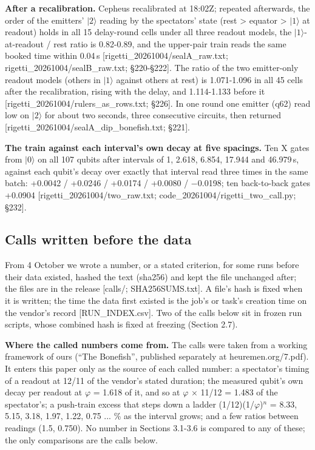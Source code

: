 \documentclass[11pt]{article}
\begin{document}
\textbf{After a recalibration.} Cepheus recalibrated at 18:02Z; repeated afterwards, the order of the emitters' \(|2\rangle\) reading by the spectators' state (rest \textgreater{} equator \textgreater{} \(|1\rangle\) at readout) holds in all 15 delay-round cells under all three readout models, the \(|1\rangle\)-at-readout / rest ratio is 0.82-0.89, and the upper-pair train reads the same booked time within 0.04\,\textmu s {[}rigetti\_20261004/sealA\_raw.txt; rigetti\_20261004/sealB\_raw.txt; \S{}220-\S{}222{]}. The ratio of the two emitter-only readout models (others in \(|1\rangle\) against others at rest) is 1.071-1.096 in all 45 cells after the recalibration, rising with the delay, and 1.114-1.133 before it {[}rigetti\_20261004/rulers\_as\_rows.txt; \S{}226{]}. In one round one emitter (q62) read low on \(|2\rangle\) for about two seconds, three consecutive circuits, then returned {[}rigetti\_20261004/sealA\_dip\_bonefish.txt; \S{}221{]}.

\textbf{The train against each interval's own decay at five spacings.} Ten X gates from \(|0\rangle\) on all 107 qubits after intervals of 1, 2.618, 6.854, 17.944 and 46.979\,\textmu s, against each qubit's decay over exactly that interval read three times in the same batch: +0.0042 / +0.0246 / +0.0174 / +0.0080 / \(-\)0.0198; ten back-to-back gates +0.0904 {[}rigetti\_20261004/two\_raw.txt; code\_20261004/rigetti\_two\_call.py; \S{}232{]}.

\subsection{Calls written before the data}
From 4 October we wrote a number, or a stated criterion, for some runs before their data existed, hashed the text (sha256) and kept the file unchanged after; the files are in the release {[}calls/; SHA256SUMS.txt{]}. A file's hash is fixed when it is written; the time the data first existed is the job's or task's creation time on the vendor's record {[}RUN\_INDEX.csv{]}. Two of the calls below sit in frozen run scripts, whose combined hash is fixed at freezing (Section 2.7).

\textbf{Where the called numbers come from.} The calls were taken from a working framework of ours (``The Bonefish'', published separately at heuremen.org/7.pdf). It enters this paper only as the source of each called number: a spectator's timing of a readout at 12/11 of the vendor's stated duration; the measured qubit's own decay per readout at \(\varphi\) = 1.618 of it, and so at \(\varphi\) \(\times\) 11/12 = 1.483 of the spectator's; a push-train excess that steps down a ladder (1/12)(1/\(\varphi\))\(^n\) = 8.33, 5.15, 3.18, 1.97, 1.22, 0.75 ... \% as the interval grows; and a few ratios between readings (1.5, 0.750). No number in Sections 3.1-3.6 is compared to any of these; the only comparisons are the calls below.
\end{document}
